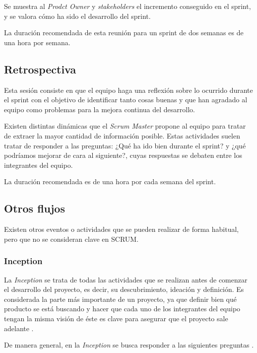Se muestra al \emph{Prodct Owner} y \emph{stakeholders} el incremento conseguido en el sprint, y se valora cómo ha sido el desarrollo del sprint.

La duración recomendada de esta reunión para un sprint de dos semanas es de una hora por semana.

\subsection{Retrospectiva}
\label{retrosopectiva}

Esta sesión consiste en que el equipo haga una reflexión sobre lo ocurrido durante el sprint con el objetivo de identificar tanto cosas buenas y que han agradado al equipo como problemas para la mejora continua del desarrollo. 

Existen distintas dinámicas que el \emph{Scrum Master} propone al equipo para tratar de extraer la mayor cantidad de información posible. Estas actividades suelen tratar de responder a las preguntas: ¿Qué ha ido bien durante el sprint? y ¿qué podríamos mejorar de cara al siguiente?, cuyas respuestas se debaten entre los integrantes del equipo.

La duración recomendada es de una hora por cada semana del sprint.

\subsection{Otros flujos}
\label{otrosFlujos}

Existen otros eventos o actividades que se pueden realizar de forma habitual, pero que no se consideran clave en SCRUM.

\subsubsection{Inception}
\label{inception}

La \emph{Inception} se trata de todas las actividades que se realizan antes de comenzar el desarrollo del proyecto, es decir, su descubrimiento, ideación y definición. Es considerada la parte más importante de un proyecto, ya que definir bien qué producto se está buscando y hacer que cada uno de los integrantes del equipo tengan la misma visión de éste es clave para asegurar que el proyecto sale adelante \cite{agileSamurai}.

De manera general, en la \emph{Inception} se busca responder a las siguientes preguntas \cite{inceptionDeck}.

